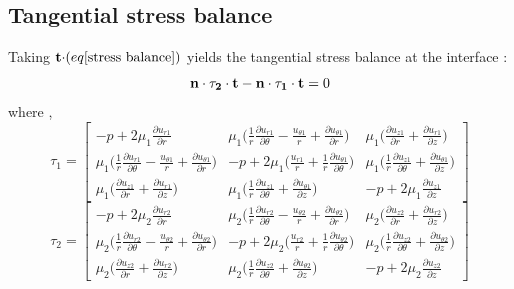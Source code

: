 \documentclass{article}
\begin{document}
\subsection{Tangential stress balance}
Taking ${\bf t \cdot}(eq {\ref {stress balance}})$  yields the tangential stress balance at the interface :
\begin{equation}
{\bf n \cdot \tau_{2} \cdot t} - {\bf n\cdot \tau_{1} \cdot t} = 0
\end{equation}
where ,
\begin{equation}
\tau_{1} =
\begin{bmatrix}
-p + 2\mu_{1} \frac{\partial u_{r1}}{\partial r}   &  \mu_{1} \bigg(\frac{1}{r}\frac{\partial u_{r1}}{\partial \theta} -\frac{u_{\theta1}}{r}+\frac{\partial u_{\theta1}}{\partial r}\bigg) & \mu_{1} \bigg(\frac{\partial u_{z1}}{\partial r} + \frac{\partial u_{r1}}{\partial z}\bigg) \\
\mu_{1} \bigg(\frac{1}{r}\frac{\partial u_{r1}}{\partial \theta} -\frac{u_{\theta1}}{r}+\frac{\partial u_{\theta1}}{\partial r}\bigg) & -p + 2\mu_{1} \bigg(\frac{u_{r1}}{r}+\frac{1}{r}\frac{\partial u_{\theta1}}{\partial \theta}\bigg)  & \mu_{1} \bigg(\frac{1}{r}\frac{\partial u_{z1}}{\partial \theta} + \frac{\partial u_{\theta1}}{\partial z}\bigg) \\
\mu_{1} \bigg(\frac{\partial u_{z1}}{\partial r} + \frac{\partial u_{r1}}{\partial z}\bigg) &  \mu_{1} \bigg(\frac{1}{r}\frac{\partial u_{z1}}{\partial \theta} + \frac{\partial u_{\theta1}}{\partial z}\bigg) & -p + 2\mu_{1} \frac{\partial u_{z1}}{\partial z}
\end{bmatrix} 
\end{equation}
\newline
\newline
\begin{equation}
\tau_{2} =
\begin{bmatrix}
-p + 2\mu_{2} \frac{\partial u_{r2}}{\partial r}   &  \mu_{2} \bigg(\frac{1}{r}\frac{\partial u_{r2}}{\partial \theta} -\frac{u_{\theta2}}{r}+\frac{\partial u_{\theta2}}{\partial r}\bigg) & \mu_{2} \bigg(\frac{\partial u_{z2}}{\partial r} + \frac{\partial u_{r2}}{\partial z}\bigg) \\
\mu_{2} \bigg(\frac{1}{r}\frac{\partial u_{r2}}{\partial \theta} -\frac{u_{\theta2}}{r}+\frac{\partial u_{\theta2}}{\partial r}\bigg) & -p + 2\mu_{2} \bigg(\frac{u_{r2}}{r}+\frac{1}{r}\frac{\partial u_{\theta2}}{\partial \theta}\bigg)  & \mu_{2} \bigg(\frac{1}{r}\frac{\partial u_{z2}}{\partial \theta} + \frac{\partial u_{\theta2}}{\partial z}\bigg) \\
\mu_{2} \bigg(\frac{\partial u_{z2}}{\partial r} + \frac{\partial u_{r2}}{\partial z}\bigg) &  \mu_{2} \bigg(\frac{1}{r}\frac{\partial u_{z2}}{\partial \theta} + \frac{\partial u_{\theta2}}{\partial z}\bigg) & -p + 2\mu_{2} \frac{\partial u_{z2}}{\partial z}
\end{bmatrix} 
\end{equation}
\end{document}
